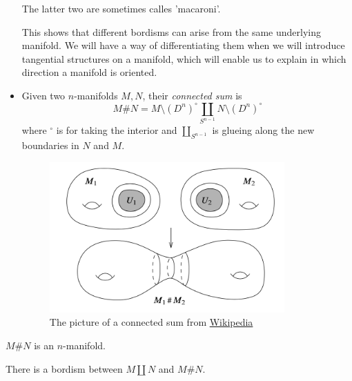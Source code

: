 \begin{ex}
\begin{itemize}
\begin{figure}[H]
\begin{subfigure}[t]{.4\textwidth}
    \end{subfigure}
    \end{figure}
    The latter two are sometimes calles 'macaroni'.
    
    This shows that different bordisms can arise from the same underlying manifold. We will have a way of differentiating them when we will introduce tangential structures on a manifold, which will enable us to explain in which direction a manifold is oriented.

    \item Given two $n$-manifolds $M,N$, their \textit{connected sum} is 
    \begin{equation*}
         M\# N=M\setminus(D^{n})^{\circ}\coprod_{S^{n-1}} N\setminus(D^{n})^{\circ}
     \end{equation*}
     where ${}^{\circ}$ is for taking the interior and $\coprod_{S^{n-1}}$ is glueing along the new boundaries in $N$ and $M$.
    \begin{figure}[!ht]
    \centering
    \captionsetup{labelformat=empty, format = hang}
        \begin{measuredfigure}
            \includegraphics[width=9cm]{images/Lecture 2/connected sum.png} \caption{\small{The picture of a connected sum from \href{https://en.wikipedia.org/wiki/Connected_sum]}{Wikipedia}}}
        \end{measuredfigure}
    \end{figure}
\end{itemize}
\end{ex}
\begin{prop}
    $M\# N$ is an $n$-manifold.
\end{prop}
\begin{lem}
    There is a bordism between $M\coprod N$ and $M\# N$.
\end{lem}

